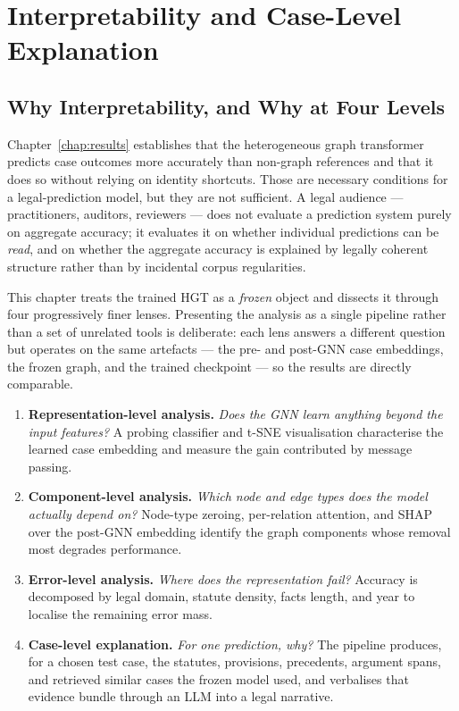 \chapter{Interpretability and Case-Level Explanation}
\label{chap:explainability}

\section{Why Interpretability, and Why at Four Levels}

Chapter~\ref{chap:results} establishes that the heterogeneous graph
transformer predicts case outcomes more accurately than non-graph
references and that it does so without relying on identity shortcuts.
Those are necessary conditions for a legal-prediction model, but they
are not sufficient.  A legal audience --- practitioners, auditors,
reviewers --- does not evaluate a prediction system purely on aggregate
accuracy; it evaluates it on whether individual predictions can be
\emph{read}, and on whether the aggregate accuracy is explained by
legally coherent structure rather than by incidental corpus
regularities.

This chapter treats the trained HGT as a \emph{frozen} object and
dissects it through four progressively finer lenses.  Presenting the
analysis as a single pipeline rather than a set of unrelated tools is
deliberate: each lens answers a different question but operates on the
same artefacts --- the pre- and post-GNN case embeddings, the frozen
graph, and the trained checkpoint --- so the results are directly
comparable.

\begin{enumerate}
  \item \textbf{Representation-level analysis.} \emph{Does the GNN
    learn anything beyond the input features?}  A probing classifier
    and t-SNE visualisation characterise the learned case embedding
    and measure the gain contributed by message passing.
  \item \textbf{Component-level analysis.} \emph{Which node and edge
    types does the model actually depend on?}  Node-type zeroing,
    per-relation attention, and SHAP over the post-GNN embedding
    identify the graph components whose removal most degrades
    performance.
  \item \textbf{Error-level analysis.} \emph{Where does the
    representation fail?}  Accuracy is decomposed by legal domain,
    statute density, facts length, and year to localise the remaining
    error mass.
  \item \textbf{Case-level explanation.} \emph{For one prediction,
    \emph{why}?}  The  pipeline produces, for a
    chosen test case, the statutes, provisions, precedents, argument
    spans, and retrieved similar cases the frozen model used, and
    verbalises that evidence bundle through an LLM into a legal
    narrative.
\end{enumerate}

